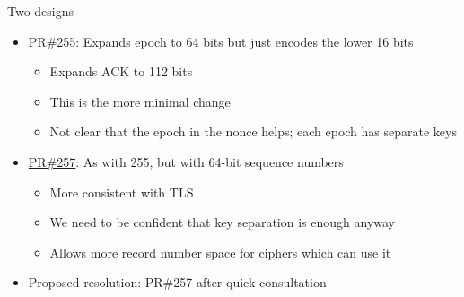 \documentclass[helvetica]{beamer}
\begin{document}
\begin{frame}{Two designs}

  \begin{itemize}
  \item \href{https://github.com/tlswg/dtls13-spec/pull/255}{PR\#255}: 
    Expands epoch to 64 bits but just encodes the lower 16 bits
      \begin{itemize}
      \item Expands ACK to 112 bits        
      \item This is the more minimal change
      \item Not clear that the epoch in the nonce helps; each epoch has separate keys
      \end{itemize}

    \item \href{https://github.com/tlswg/dtls13-spec/pull/257}{PR\#257}:
        As with 255, but with 64-bit sequence numbers
        \begin{itemize}
        \item More consistent with TLS
        \item We need to be confident that key separation is enough anyway
        \item Allows more record number space for ciphers which can use it
        \end{itemize}
      \item Proposed resolution: PR\#257 after quick consultation
    \end{itemize}
\end{frame}                             



\end{document}
